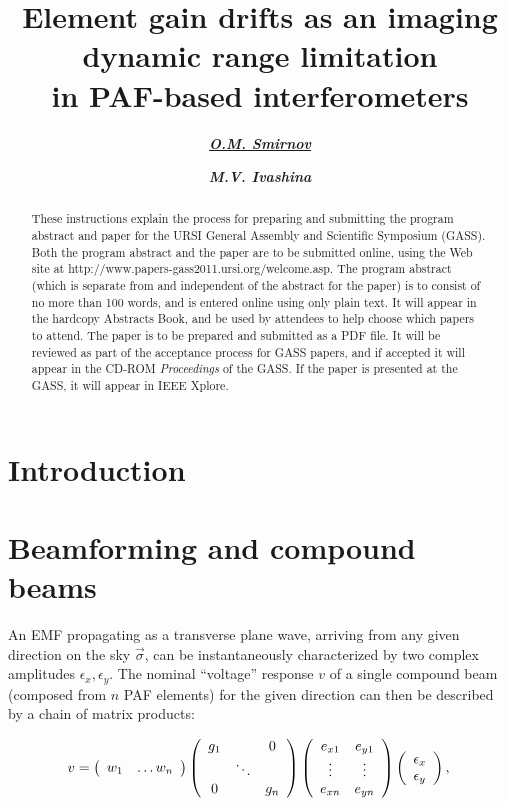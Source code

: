 \documentclass{aps2010} \special{papersize=8.5in,11in}
\title{Element gain drifts as an imaging dynamic range limitation\\in PAF-based
interferometers}
\author[org1]{\textbf{\underline{\emph{O.M. Smirnov}}}}
\author[org2]{\textbf{\emph{M.V. Ivashina}}}
\begin{document}
\maketitleblock

\begin{abstract}
These instructions explain the process for preparing and submitting
the program abstract and paper for the URSI General Assembly and
Scientific Symposium (GASS). Both the program abstract and the paper
are to be submitted online, using the Web site at
http://www.papers-gass2011.ursi.org/welcome.asp. The program
abstract (which is separate from and independent of the abstract for
the paper) is to consist of no more than 100 words, and is entered
online using only plain text. It will appear in the hardcopy
Abstracts Book, and be used by attendees to help choose which papers
to attend. The paper is to be prepared and submitted as a PDF file.
It will be reviewed as part of the acceptance process for GASS
papers, and if accepted it will appear in the CD-ROM
\emph{Proceedings} of the GASS. If the paper is presented at the
GASS, it will appear in IEEE Xplore.
\end{abstract}

\section*{Introduction}


\section{Beamforming and compound beams}

An EMF propagating as a transverse plane wave, arriving from any given direction on the sky $\vec\sigma$, can be 
instantaneously characterized by two complex amplitudes $\epsilon_x,\epsilon_y$. The nominal ``voltage'' response $v$ of a single   
compound beam (composed from $n$ PAF elements) for the given direction can then be described by a chain of matrix products:

\begin{equation}
v =
\left( 
  \begin{array}{ccc}
  w_{1} & \ldots w_n 
  \end{array} 
\right)
\left( 
  \begin{array}{ccc}
  g_{1} & & 0\\
  & \ddots & \\
  0 & & g_n  
  \end{array} 
\right) 
\left( 
  \begin{array}{cc}
  e_{x1} & e_{y1} \\
  \vdots & \vdots \\
  e_{xn} & e_{yn} 
  \end{array} 
\right) 
\left(
  \begin{array}{c}
  \epsilon_x \\
  \epsilon_y
  \end{array} 
\right), \\
\end{equation}
\end{document}
